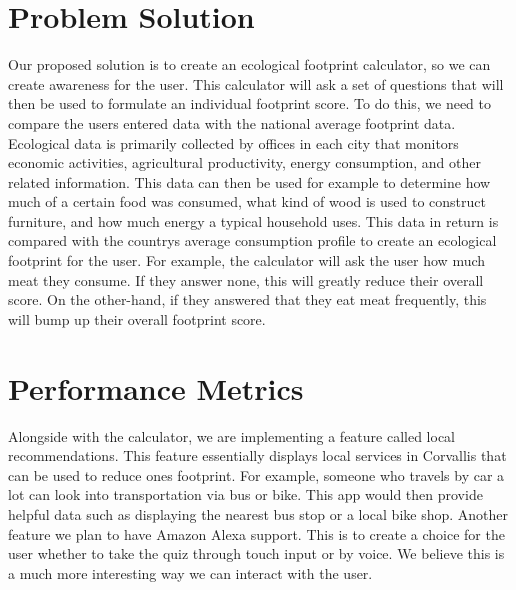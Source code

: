 \documentclass[10pt,draftclsnofoot,onecolumn,journal,compsoc]{IEEEtran}
\begin{document}
\section{Problem Solution}

Our proposed solution is to create an ecological footprint calculator, so we can create awareness for the user. This
calculator will ask a set of questions that will then be used to formulate an individual footprint score. To do this, we
need to compare the users entered data with the national average footprint data. Ecological data is primarily collected by
offices in each city that monitors economic activities, agricultural productivity, energy consumption, and other related
information. This data can then be used for example to determine how much of a certain food was consumed, what kind
of wood is used to construct furniture, and how much energy a typical household uses. This data in return is compared
with the countrys average consumption profile to create an ecological footprint for the user. For example, the calculator
will ask the user how much meat they consume. If they answer none, this will greatly reduce their overall score. On the
other-hand, if they answered that they eat meat frequently, this will bump up their overall footprint score.


\section{Performance Metrics}

Alongside with the calculator, we are implementing a feature called local recommendations. This feature essentially
displays local services in Corvallis that can be used to reduce ones footprint. For example, someone who travels by car a
lot can look into transportation via bus or bike. This app would then provide helpful data such as displaying the nearest
bus stop or a local bike shop. Another feature we plan to have Amazon Alexa support. This is to create a choice for the
user whether to take the quiz through touch input or by voice. We believe this is a much more interesting way we can
interact with the user.   
\end{document}
